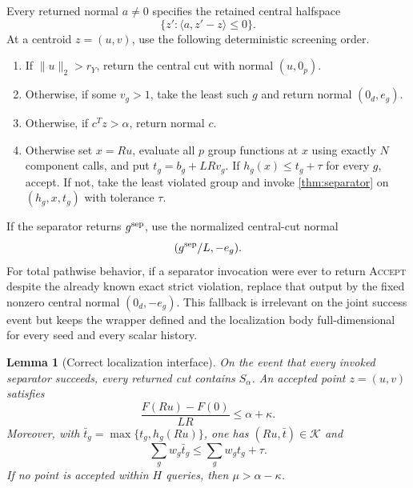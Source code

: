 \documentclass[11pt]{article}
\numberwithin{equation}{section}
\newtheorem{lemma}[lemma]{Lemma}
\theoremstyle{remark}
\theoremstyle{definition}
\newcommand{\cK}{\mathcal{K}}
\newcommand{\ip}[2]{\langle #1,#2\rangle}
\newcommand{\norm}[1]{\lVert #1\rVert_2}
\begin{document}
Every returned normal $a\ne0$ specifies the retained central halfspace
\[
  \{z':\ip a{z'-z}\le0\}.
\]
At a centroid $z=(u,v)$, use the following deterministic screening order.
\begin{enumerate}
\item If $\norm u>r_Y$, return the central cut with normal $(u,0_p)$.
\item Otherwise, if some $v_g>1$, take the least such $g$ and return normal $(0_d,e_g)$.
\item Otherwise, if $c^Tz>\alpha$, return normal $c$.
\item Otherwise set $x=Ru$, evaluate all $p$ group functions at $x$ using exactly $N$ component calls, and put $t_g=b_g+LRv_g$.  If $h_g(x)\le t_g+\tau$ for every $g$, accept.  If not, take the least violated group and invoke \cref{thm:separator} on $(h_g,x,t_g)$ with tolerance $\tau$.
\end{enumerate}
If the separator returns $g^{\rm sep}$, use the normalized central-cut normal
\[
(g^{\rm sep}/L,-e_g).
\]
For total pathwise behavior, if a separator invocation were ever to return
\textsc{Accept} despite the already known exact strict violation, replace that
output by the fixed nonzero central normal $(0_d,-e_g)$.  This fallback is
irrelevant on the joint success event but keeps the wrapper defined and the
localization body full-dimensional for every seed and every scalar history.

\begin{lemma}[Correct localization interface]
\label{lem:sep-interface}
On the event that every invoked separator succeeds, every returned cut contains $S_\alpha$.  An accepted point $z=(u,v)$ satisfies
\begin{equation}
\frac{F(Ru)-F(0)}{LR}\le\alpha+\kappa.
\label{eq:accepted-objective}
\end{equation}
Moreover, with $\bar t_g=\max\{t_g,h_g(Ru)\}$, one has $(Ru,\bar t)\in\cK$ and
\begin{equation}
\sum_gw_g\bar t_g\le\sum_gw_gt_g+\tau.
\label{eq:repaired-lift}
\end{equation}
If no point is accepted within $H$ queries, then $\mu>\alpha-\kappa$.
\end{lemma}
\end{document}
